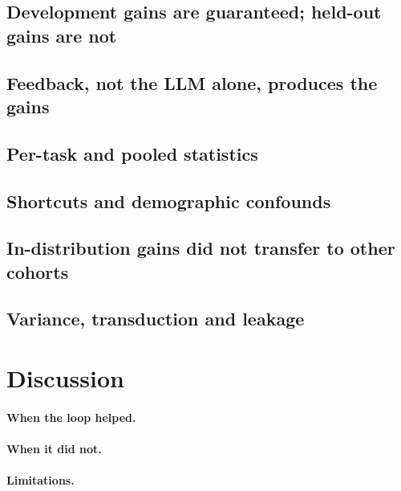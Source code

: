 \documentclass[11pt]{article}
\begin{document}
\subsection{Development gains are guaranteed; held-out gains are not}\label{sec:dev-eval}

\subsection{Feedback, not the LLM alone, produces the gains}\label{sec:baselines-results}

\subsection{Per-task and pooled statistics}\label{sec:stats-results}

\subsection{Shortcuts and demographic confounds}\label{sec:shortcuts}

\subsection{In-distribution gains did not transfer to other cohorts}\label{sec:transfer}

\subsection{Variance, transduction and leakage}\label{sec:variance}

\section{Discussion}\label{sec:discussion}

\paragraph{When the loop helped.}

\paragraph{When it did not.}

\paragraph{Limitations.}
\end{document}

